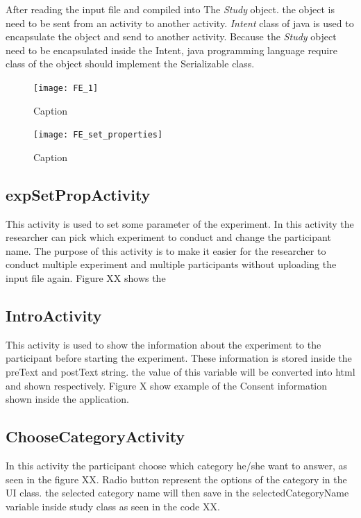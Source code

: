 After reading the input file and compiled into The \textit{Study} object. the object is need to be sent from an activity to another activity. \textit{Intent} class of java is used to encapsulate the object and send to another activity. Because the \textit{Study} object need to be encapsulated inside the Intent, java programming language require class of the object should implement the Serializable class.




\begin{figure}
\centering
\begin{minipage}[b]{.4\textwidth}
\texttt{[image: FE\_1]}
\caption{Caption}\label{label-a}
\end{minipage}\qquad
\begin{minipage}[b]{.4\textwidth}
\texttt{[image: FE\_set\_properties]}
\caption{Caption}\label{label-b}
\end{minipage}
\end{figure}

\subsection{expSetPropActivity}
This activity is used to set some parameter of the experiment. In this activity the researcher can pick which experiment to conduct and change the participant name. The purpose of this activity is to make it easier for the researcher to conduct multiple experiment and multiple participants without uploading the input file again. Figure XX shows the

\subsection{IntroActivity}
This activity is used to show the information about the experiment to the participant before starting the experiment. These information is stored inside the preText and postText string. the value of this variable will be converted into html and shown respectively.
Figure X show example of the Consent information shown inside the application.

\subsection{ChooseCategoryActivity}
In this activity the participant choose which category he/she want to answer, as seen in the figure XX.
Radio button represent the options of the category in the UI class. the selected category name will then save in the selectedCategoryName variable inside study class as seen in the code XX.

